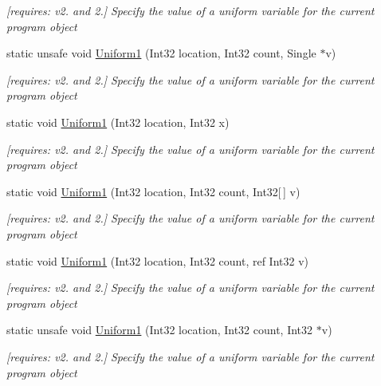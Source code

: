 \begin{DoxyCompactItemize}
\begin{DoxyCompactList}\small\item\em \mbox{[}requires\-: v2. and 2.\mbox{]} Specify the value of a uniform variable for the current program object \end{DoxyCompactList}\item 
static unsafe void \hyperlink{class_open_t_k_1_1_graphics_1_1_e_s20_1_1_g_l_abc9f3b50caec29e9ca02d0e3c4f26818}{Uniform1} (Int32 location, Int32 count, Single $\ast$v)
\begin{DoxyCompactList}\small\item\em \mbox{[}requires\-: v2. and 2.\mbox{]} Specify the value of a uniform variable for the current program object \end{DoxyCompactList}\item 
static void \hyperlink{class_open_t_k_1_1_graphics_1_1_e_s20_1_1_g_l_af2a3cd3388a68e1968e051b3a5a0c540}{Uniform1} (Int32 location, Int32 x)
\begin{DoxyCompactList}\small\item\em \mbox{[}requires\-: v2. and 2.\mbox{]} Specify the value of a uniform variable for the current program object \end{DoxyCompactList}\item 
static void \hyperlink{class_open_t_k_1_1_graphics_1_1_e_s20_1_1_g_l_a20824aa7088583565a1d2b25d385e185}{Uniform1} (Int32 location, Int32 count, Int32\mbox{[}$\,$\mbox{]} v)
\begin{DoxyCompactList}\small\item\em \mbox{[}requires\-: v2. and 2.\mbox{]} Specify the value of a uniform variable for the current program object \end{DoxyCompactList}\item 
static void \hyperlink{class_open_t_k_1_1_graphics_1_1_e_s20_1_1_g_l_aeb3775b63cd932d0b7cc78720925bd6d}{Uniform1} (Int32 location, Int32 count, ref Int32 v)
\begin{DoxyCompactList}\small\item\em \mbox{[}requires\-: v2. and 2.\mbox{]} Specify the value of a uniform variable for the current program object \end{DoxyCompactList}\item 
static unsafe void \hyperlink{class_open_t_k_1_1_graphics_1_1_e_s20_1_1_g_l_a0c4171aab7e16a75598a73b5410db892}{Uniform1} (Int32 location, Int32 count, Int32 $\ast$v)
\begin{DoxyCompactList}\small\item\em \mbox{[}requires\-: v2. and 2.\mbox{]} Specify the value of a uniform variable for the current program object \end{DoxyCompactList}\item 

\end{DoxyCompactItemize}
